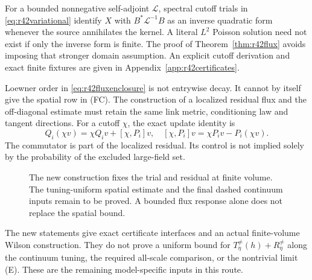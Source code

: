 For a bounded nonnegative self-adjoint $\mathscr L$, spectral cutoff
trials in \eqref{eq:r42variational} identify $X$ with
$B^*\mathscr L^{-1}B$ as an inverse quadratic form whenever the source
annihilates the kernel. A literal $L^2$ Poisson solution need not exist
if only the inverse form is finite. The proof of
Theorem~\ref{thm:r42flux} avoids imposing that stronger domain
assumption. An explicit cutoff derivation and exact finite fixtures
are given in Appendix~\ref{app:r42certificates}.

Loewner order in \eqref{eq:r42fluxenclosure} is not entrywise decay.
It cannot by itself give the spatial row in (FC). The construction of
a localized residual flux and the off-diagonal estimate must retain
the same link metric, conditioning law and tangent directions.
For a cutoff $\chi$, the exact update identity is
\begin{equation}\label{eq:r42cutoff}
 Q_i(\chi v)=\chi Q_iv+[\chi,P_i]v,
 \quad [\chi,P_i]v=\chi P_iv-P_i(\chi v).
\end{equation}
The commutator is part of the localized residual. Its control is not
implied solely by the probability of the excluded large-field set.

\begin{figure}[tb]
\centering
{}
\caption{The new construction fixes the trial and residual at finite
volume. The tuning-uniform spatial estimate and the final dashed
continuum inputs remain to be proved. A bounded flux response alone
does not replace the spatial bound.}
\label{fig:r42chain}
\end{figure}

The new statements give exact certificate interfaces and an actual
finite-volume Wilson construction. They do not prove a uniform bound
for $T_\eta^{\ne}(h)+R_\eta^{\ne}$ along the continuum tuning, the
required all-scale comparison, or the nontrivial limit (E). These are
the remaining model-specific inputs in this route.

